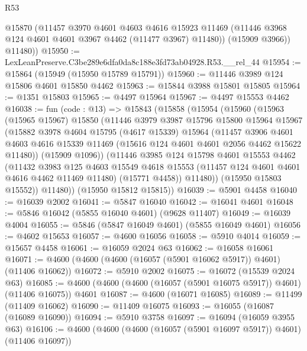 \begin{lexlean}{R53}
\begin{coremodule}
          @15870
          (@11457
            @3970
            @4601
            @4603
            @4616
            @15923
            @11469
            (@11446 @3968 @124 @4601 @4601 @3967 @4462 (@11477 @3967) @11480))
          (@15909 @3966))
        @11480))
@15950 := LexLeanPreserve.C3be289e6dfa0da8c188e3fd73ab04928.R53.__rel_44
@15954 := @15864 (@15949 (@15950 @15789 @15791))
@15960 := @11446 @3989 @124 @15806 @4601 @15850 @4462
@15963 := @15844 @3988 @15801 @15805
@15964 := @1351 @15803
@15965 := @4497 @15964
@15967 := @4497 @15553 @4462
@16038 := fun (code : @13) =>
  @15843
    (@15858
      (@15954
        (@15960
          (@15963
            (@15965 @15967)
            @15850
            (@11446
              @3979
              @3987
              @15796
              @15800
              @15964
              @15967
              (@15882
                @3978
                @4604
                @15795
                (@4617 @15339)
                @15964
                (@11457
                  @3906
                  @4601
                  @4603
                  @4616
                  @15339
                  @11469
                  (@15616 @124 @4601 @4601 @2056 @4462 @15622 @11480))
                (@15909 @1096))
              (@11446
                @3985
                @124
                @15798
                @4601
                @15553
                @4462
                (@11432
                  @3983
                  @125
                  @4603
                  @15549
                  @4618
                  @15553
                  (@11457 @124 @4601 @4601 @4616 @4462 @11469 @11480)
                  (@15771 @4458))
                @11480))
            (@15950 @15803 @15552))
          @11480))
      (@15950 @15812 @15815))
@16039 := @5901 @4458
@16040 := @16039 @2002
@16041 := @5847 @16040
@16042 := @16041 @4601
@16048 := @5846 @16042 (@5855 @16040 @4601) (@9628 @11407)
@16049 := @16039 @4004
@16055 := @5846 (@5847 @16049 @4601) (@5855 @16049 @4601)
@16056 := @4602 @15653
@16057 := @4600 @16056
@16058 := @5910 @4014
@16059 := @15657 @4458
@16061 := @16059 @2024 @63
@16062 := @16058 @16061
@16071 := @4600 (@4600 (@4600 (@16057 (@5901 @16062 @5917)) @4601) (@11406 @16062))
@16072 := @5910 @2002
@16075 := @16072 (@15539 @2024 @63)
@16085 := @4600 (@4600 (@4600 (@16057 (@5901 @16075 @5917)) @4601) (@11406 @16075)) @4601
@16087 := @4600 (@16071 @16085)
@16089 := @11499 (@11409 @16062)
@16090 := @11409 @16075
@16093 := @16055 (@16087 (@16089 @16090))
@16094 := @5910 @3758
@16097 := @16094 (@16059 @3955 @63)
@16106 := @4600 (@4600 (@4600 (@16057 (@5901 @16097 @5917)) @4601) (@11406 @16097))

\end{coremodule}
\end{lexlean}
